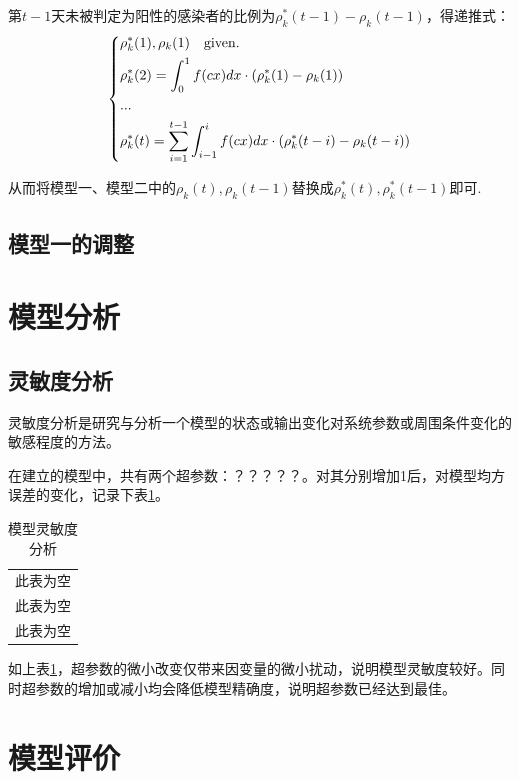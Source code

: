 \documentclass[withoutpreface,bwprint]{cumcmthesis} %
\begin{document}
第$t-1$天未被判定为阳性的感染者的比例为$\rho^*_k(t-1)-\rho_k(t-1)$，得递推式：
\begin{align}
\left\{
\begin{aligned}
    & \rho^*_k(1),\rho_k(1)\quad {\rm given.}\\
    & \rho^*_k(2) =\int^1_0 f(cx)dx\cdot \left(\rho^*_k(1)-\rho_k(1) \right)   \\
    & ...  \\
    & \rho^*_k(t) = \sum^{t-1}_{i=1} \int^i_{i-1} f(cx)dx \cdot \left(\rho^*_k(t-i)-\rho_k(t-i) \right) 
\end{aligned}
 \right.  
\end{align}

从而将模型一、模型二中的$\rho_k(t),\rho_k(t-1)$替换成$\rho^*_k(t),\rho^*_k(t-1)$即可.




\subsection{模型一的调整}

\section{模型分析}
\subsection{灵敏度分析}
灵敏度分析是研究与分析一个模型的状态或输出变化对系统参数或周围条件变化的敏感程度的方法。

在建立的模型中，共有两个超参数：？？？？？。对其分别增加1后，对模型均方误差的变化，记录下表\ref{模型灵敏度分析}。

\begin{table}[H]
\caption{模型灵敏度分析}
\label{模型灵敏度分析}
\centering
\begin{tabular}{l}
\toprule
此表为空\\ 
 此表为空\\ 
\midrule
此表为空\\ 

\bottomrule
\end{tabular}
\end{table}

如上表\ref{模型灵敏度分析}，超参数的微小改变仅带来因变量的微小扰动，说明模型灵敏度较好。同时超参数的增加或减小均会降低模型精确度，说明超参数已经达到最佳。


\section{模型评价}
\end{document}
